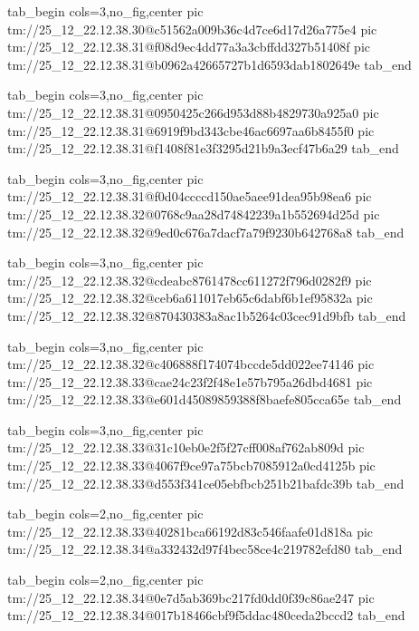  
 
 
 
 

\qqSecCmtScr


\ifcmt
  tab_begin cols=3,no_fig,center
    pic tm://25_12_22.12.38.30@c51562a009b36c4d7ce6d17d26a775e4
    pic tm://25_12_22.12.38.31@f08d9ec4dd77a3a3cbffdd327b51408f
    pic tm://25_12_22.12.38.31@b0962a42665727b1d6593dab1802649e
  tab_end
\fi


\ifcmt
  tab_begin cols=3,no_fig,center
    pic tm://25_12_22.12.38.31@0950425c266d953d88b4829730a925a0
    pic tm://25_12_22.12.38.31@6919f9bd343cbe46ac6697aa6b8455f0
    pic tm://25_12_22.12.38.31@f1408f81e3f3295d21b9a3ecf47b6a29
  tab_end
\fi


\ifcmt
  tab_begin cols=3,no_fig,center
    pic tm://25_12_22.12.38.31@f0d04ccccd150ae5aee91dea95b98ea6
    pic tm://25_12_22.12.38.32@0768c9aa28d74842239a1b552694d25d
    pic tm://25_12_22.12.38.32@9ed0c676a7dacf7a79f9230b642768a8
  tab_end
\fi


\ifcmt
  tab_begin cols=3,no_fig,center
    pic tm://25_12_22.12.38.32@cdeabc8761478cc611272f796d0282f9
    pic tm://25_12_22.12.38.32@ceb6a611017eb65c6dabf6b1ef95832a
    pic tm://25_12_22.12.38.32@870430383a8ac1b5264c03cec91d9bfb
  tab_end
\fi


\ifcmt
  tab_begin cols=3,no_fig,center
    pic tm://25_12_22.12.38.32@c406888f174074bccde5dd022ee74146
    pic tm://25_12_22.12.38.33@cae24c23f2f48e1e57b795a26dbd4681
    pic tm://25_12_22.12.38.33@e601d45089859388f8baefe805cca65e
  tab_end
\fi


\ifcmt
  tab_begin cols=3,no_fig,center
    pic tm://25_12_22.12.38.33@31c10eb0e2f5f27cff008af762ab809d
    pic tm://25_12_22.12.38.33@4067f9ce97a75bcb7085912a0cd4125b
    pic tm://25_12_22.12.38.33@d553f341ce05ebfbcb251b21bafdc39b
  tab_end
\fi


\ifcmt
  tab_begin cols=2,no_fig,center
    pic tm://25_12_22.12.38.33@40281bca66192d83c546faafe01d818a
    pic tm://25_12_22.12.38.34@a332432d97f4bec58ce4c219782efd80
  tab_end
\fi


\ifcmt
  tab_begin cols=2,no_fig,center
    pic tm://25_12_22.12.38.34@0e7d5ab369bc217fd0dd0f39c86ae247
    pic tm://25_12_22.12.38.34@017b18466cbf9f5ddac480ceda2bccd2
  tab_end
\fi


